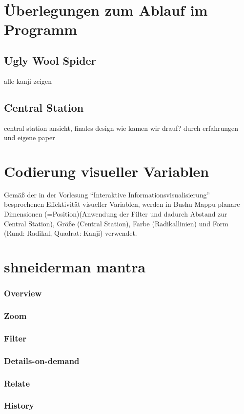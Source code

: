 \documentclass[color,german]{tudbook}
\begin{document}
\section{Überlegungen zum Ablauf im Programm}
\subsection{Ugly Wool Spider}
alle kanji zeigen

\subsection{Central Station}
central station ansicht, finales design
wie kamen wir drauf? durch erfahrungen und eigene paper

\section{Codierung visueller Variablen}
Gemäß der in der Vorlesung "`Interaktive Informationsvisualisierung"' besprochenen Effektivität visueller Variablen, werden in Bushu Mappu planare Dimensionen (=Position)(Anwendung der Filter und dadurch Abstand zur Central Station), Größe (Central Station), Farbe (Radikallinien) und Form (Rund: Radikal, Quadrat: Kanji) verwendet. 

\section{shneiderman mantra}
\subsubsection{Overview}
\subsubsection{Zoom}
\subsubsection{Filter}
\subsubsection{Details-on-demand}
\subsubsection{Relate}
\subsubsection{History}
\end{document}
